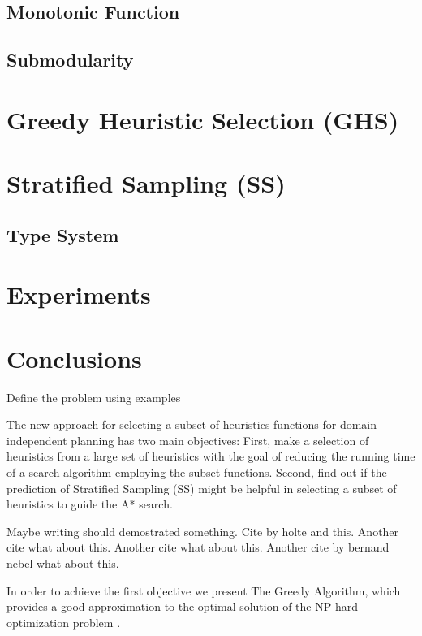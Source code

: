 \documentclass[a4paper,12pt]{article}
\begin{document}
\subsection{Monotonic Function}


\subsection{Submodularity}

\section{Greedy Heuristic Selection (GHS)}

\section{Stratified Sampling (SS)}


\subsection{Type System}

\section{Experiments}

\section{Conclusions}


Define the problem using examples




The new approach for selecting a subset of heuristics functions for domain-independent planning has two main objectives: First, make a selection of heuristics from a large set of heuristics with the goal of reducing the running time of a search algorithm employing the subset functions. Second, find out if the prediction of Stratified Sampling (SS) might be helpful in selecting a subset of heuristics to guide the A* search.

Maybe writing \citep{krause2012submodular} should demostrated something.
Cite by holte \citep{holte2006maximizing} and this.
Another cite \citep{xu2014solving} what about this.
Another cite \citep{krause2007near} what about this.
Another cite by bernand nebel \citep{backstrom1995complexity} what about this.


In order to achieve the first objective we present The Greedy Algorithm, which provides a good approximation to the optimal solution of the NP-hard optimization problem \citep{krause2012submodular}. 
\end{document}
